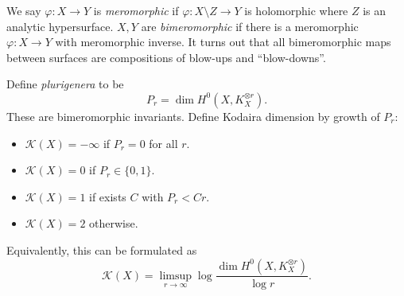 \documentclass[a4paper]{article}
\begin{document}
We say \(\varphi: X \to Y\) is \emph{meromorphic} if \(\varphi: X \setminus Z \to Y\) is holomorphic where \(Z\) is an analytic hypersurface. \(X, Y\) are \emph{bimeromorphic} if there is a meromorphic \(\varphi: X \to Y\) with meromorphic inverse. It turns out that all bimeromorphic maps between surfaces are compositions of blow-ups and ``blow-downs''.

Define \emph{plurigenera} to be
\[
  P_r = \dim H^0(X, K_X^{\otimes r}).
\]
These are bimeromorphic invariants. Define Kodaira dimension by growth of \(P_r\):
\begin{itemize}
\item \(\mathcal K(X) = -\infty\) if \(P_r = 0\) for all \(r\).
\item \(\mathcal K(X) = 0\) if \(P_r \in \{0, 1\}\).
\item \(\mathcal K(X) = 1\) if exists \(C\) with \(P_r < Cr\).
\item \(\mathcal K(X) = 2\) otherwise.
\end{itemize}
Equivalently, this can be formulated as
\[
  \mathcal K(X) = \limsup_{r \to \infty} \log \frac{\dim H^0(X, K_X^{\otimes r})}{\log r}.
\]
\end{document}
